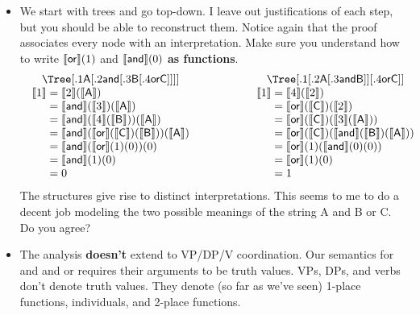 \begin{itemize}
	\item We start with trees and go top-down. I leave out justifications of each step, but you should be able to reconstruct them. Notice again that the proof associates every node with an interpretation.  Make sure you understand how to write $\llbracket \textsf{or} \rrbracket(1)$ and $\llbracket \textsf{and} \rrbracket(0)$ \textbf{as functions}.%
		\[\begin{array}{c@{\hspace{5em}}c}
		\begin{array}{c}\Tree [.1 \textsf{A} [.2 \textsf{and} [.3 \textsf{B} [.4 \textsf{or}  \textsf{C} ] ] ] ]\end{array}%
		&
		\begin{array}{c}\Tree [.1 [.2 \textsf{A} [.3 \textsf{and} \textsf{B} ] ] [.4 \textsf{or}  \textsf{C} ] ]\end{array}%
		\\
		\begin{array}{r@{}l}
		{\sv{1}} ={}& {\sv{2}}(\sv{\textsf{A}})
		\\
		={}& \sv{\textsf{and}}({\sv{3}})(\sv{\textsf{A}})
		\\
		={}& \sv{\textsf{and}}({\sv{4}}(\sv{\textsf{B}}))(\sv{\textsf{A}}) %
		\\
		={}& \sv{\textsf{and}}(\sv{\textsf{or}}(\sv{\textsf{C}})(\sv{\textsf{B}}))(\sv{\textsf{A}}) %
		\\
		={}& \sv{\textsf{and}}(\sv{\textsf{or}}(1)(0))(0)
		\\
		={}& \sv{\textsf{and}}(1)(0)
		\\
		={}& 0
		\end{array}
		&
		\begin{array}{r@{}l}
			{\sv{1}} ={}& {\sv{4}}(\sv{2})
			\\
			={}& \sv{\textsf{or}}(\sv{\textsf{C}})({\sv{2}})
			\\
			={}& \sv{\textsf{or}}(\sv{\textsf{C}})({\sv{3}}(\sv{\textsf{A}}))%
			\\
			={}& \sv{\textsf{or}}(\sv{\textsf{C}})(\sv{\textsf{and}}(\sv{\textsf{B}})(\sv{\textsf{A}}))%
			\\
			={}& \sv{\textsf{or}}(1)(\sv{\textsf{and}}(0)(0))
			\\
			={}& \sv{\textsf{or}}(1)(0)
			\\
			={}& 1
		\end{array}
		\end{array}\]
	The structures give rise to distinct interpretations. This seems to me to do a decent job modeling the two possible meanings of the string \textsf{A and B or C}. Do you agree?%

	\item The analysis \textbf{doesn't} extend to VP/DP/V coordination. Our semantics for {\sf and} and {\sf or} requires their arguments to be truth values. VPs, DPs, and verbs don't denote truth values. They denote (so far as we've seen) 1-place functions, individuals, and 2-place functions.%
\end{itemize}


